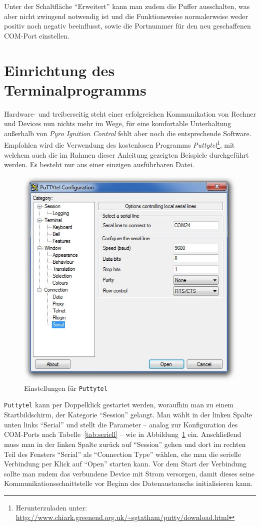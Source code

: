 \documentclass[pdftex, parskip, numbers=noenddot, toc=listof]{scrbook}
\newcommand{\pic}{\emph{Pyro Ignition Control}}
\begin{document}
			Unter der Schaltfläche \enquote{Erweitert} kann man zudem die Puffer ausschalten, was aber nicht zwingend notwendig ist und die Funktionsweise normalerweise weder positiv noch negativ beeinflusst, sowie die Portnummer für den neu geschaffenen COM-Port einstellen.


		\section{Einrichtung des Terminalprogramms}

			Hardware- und treiberseitig steht einer erfolgreichen Kommunikation von Rechner und Devices nun nichts mehr im Wege, für eine komfortable Unterhaltung außerhalb von {\pic} fehlt aber noch die entsprechende Software. Empfohlen wird die Verwendung des kostenlosen Programms \emph{Puttytel}\footnote{Herunterzuladen unter: \url{http://www.chiark.greenend.org.uk/~sgtatham/putty/download.html}}, mit welchem auch die im Rahmen dieser Anleitung gezeigten Beispiele durchgeführt werden. Es besteht nur aus einer einzigen ausführbaren Datei.

			\begin{figure}
				\centering
				\includegraphics[width=.75\textwidth]{Bilder/puttytelstart}
				\caption{Einstellungen für \texttt{Puttytel}}
				\label{fig:puttytelstart}
			\end{figure}

			\texttt{Puttytel} kann per Doppelklick gestartet werden, woraufhin man zu einem Startbildschirm, der Kategorie \enquote{Session} gelangt. Man wählt in der linken Spalte unten links \enquote{Serial} und stellt die Parameter -- analog zur Konfiguration des COM-Ports nach Tabelle~\ref{tab:seriell} -- wie in Abbildung~\ref{fig:puttytelstart} ein. Anschließend muss man in der linken Spalte zurück auf \enquote{Session} gehen und dort im rechten Teil des Fensters \enquote{Serial} als \enquote{Connection Type} wählen, ehe man die serielle Verbindung per Klick auf \enquote{Open} starten kann. Vor dem Start der Verbindung sollte man zudem das verbundene Device mit Strom versorgen, damit dieses seine Kommunikationsschnittstelle vor Beginn des Datenaustauschs initialisieren kann.
\end{document}
